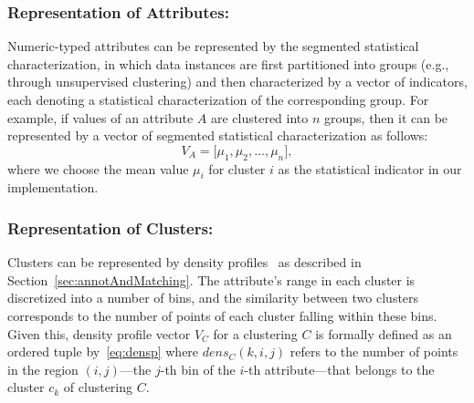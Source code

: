 \subsubsection{Representation of Attributes:}
Numeric-typed attributes can be represented by the segmented statistical characterization, in which data instances are first partitioned into groups (e.g., through unsupervised clustering) and then characterized by a vector of indicators, each denoting a statistical characterization of the corresponding group. For example, if values of an attribute $A$ are clustered into $n$ groups, then it can be represented by a vector of segmented statistical characterization as follows:
\[
V_A=\bigg[\mu_1, \mu_2, \ldots, \mu_n\bigg],
\]
where we choose the mean value $\mu_i$ for cluster $i$ as the statistical indicator in our implementation.

\subsubsection{Representation of Clusters:}
Clusters can be represented by density profiles~\cite{Bae2010} as described in Section~\ref{sec:annotAndMatching}. The attribute's range in each cluster is discretized into a number of bins, and the similarity between two clusters corresponds to the number of points of each cluster falling within these bins. Given this, density profile vector $V_C$ for a clustering $C$ is formally defined as an ordered tuple by~\ref{eq:densp}
where $dens_C(k, i, j)$ refers to the number of points in the region $(i, j)$---the $j$-th bin of the $i$-th attribute---that belongs to the cluster $c_k$ of clustering $C$.

